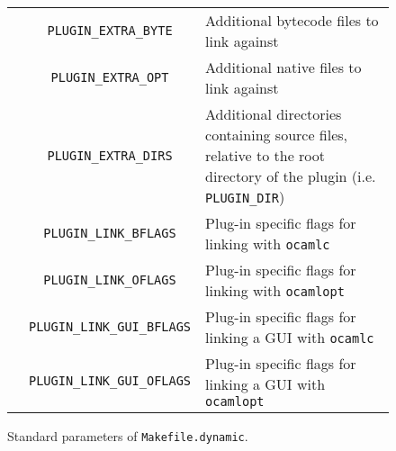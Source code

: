 \begin{figure}[htbp]
\begin{center}
\begin{tabularx}{\textwidth}{|c|c|X|}
& \texttt{PLUGIN\_EXTRA\_BYTE} & Additional bytecode files to link against \\
& \texttt{PLUGIN\_EXTRA\_OPT} & Additional native files to link against \\
& \texttt{PLUGIN\_EXTRA\_DIRS} & Additional directories containing source files, relative to the root directory of the plugin (i.e. \texttt{PLUGIN\_DIR}) \\
& \texttt{PLUGIN\_LINK\_BFLAGS} & Plug-in specific flags for linking with
\texttt{ocamlc} \\
& \texttt{PLUGIN\_LINK\_OFLAGS} & Plug-in specific flags for linking with
\texttt{ocamlopt} \\
& \texttt{PLUGIN\_LINK\_GUI\_BFLAGS} & Plug-in specific flags for linking a GUI
with \texttt{ocamlc} \\
& \texttt{PLUGIN\_LINK\_GUI\_OFLAGS} & Plug-in specific flags for linking a GUI
with \texttt{ocamlopt} \\
\hline
\end{tabularx}
\end{center}
\caption{Standard parameters of \texttt{Makefile.dynamic}.}\label{fig:make-parameters}
\end{figure}
